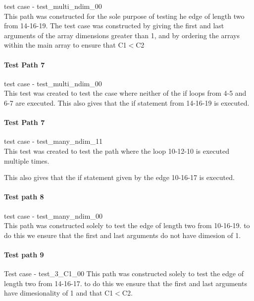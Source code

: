test case - test\_multi\_ndim\_00\\
This path was constructed for the sole purpose of testing he edge of length two from 14-16-19.
The test case was constructed by giving the first and last arguments of the array dimensions greater than 1, and by ordering the arrays within the main array to ensure that C1$<$C2 

\paragraph{Test Path 7}

test case - test\_multi\_ndim\_00\\
This test was created to test the case where neither of the if loops from 4-5 and 6-7 are executed. This also gives that the if statement from 14-16-19 is executed.  


\paragraph{Test Path 7}
test case - test\_many\_ndim\_11\\

This test was created to test the path where the loop 10-12-10 is executed multiple times.

This also gives that the if statement given by the edge 10-16-17 is executed.  


\paragraph{Test path 8}%
test case - test\_many\_ndim\_00\\

This path was constructed solely to test the edge of length two from 10-16-19. to do this we ensure that the first and last arguments do not have dimesion of 1.

\paragraph{Test path 9}%

Test case - test\_3\_C1\_00
This path was constructed solely to test the edge of length two from 14-16-17. to do this we ensure that the first and last arguments have dimesionality of 1 and that C1$<$C2.

